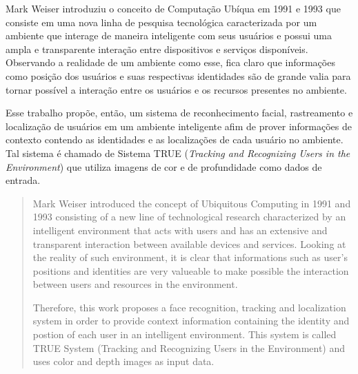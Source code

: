 \begin{resumo}

	Mark Weiser introduziu o conceito de Computação Ubíqua em 1991 e 1993 que consiste em uma nova linha de pesquisa tecnológica caracterizada por um ambiente que interage de maneira inteligente com seus usuários e possui uma ampla e transparente interação entre dispositivos e serviços disponíveis. Observando a realidade de um ambiente como esse, fica claro que informações como posição dos usuários e suas respectivas identidades são de grande valia para tornar possível a interação entre os usuários e os recursos presentes no ambiente.

	Esse trabalho propõe, então, um sistema de reconhecimento facial, rastreamento e localização de usuários em um ambiente inteligente afim de prover informações de contexto contendo as identidades e as localizações de cada usuário no ambiente. Tal sistema é chamado de Sistema TRUE (\textit{Tracking and Recognizing Users in the Environment}) que utiliza imagens de cor e de profundidade como dados de entrada.

\end{resumo}


\begin{abstract}
	
	Mark Weiser introduced the concept of Ubiquitous Computing in 1991 and 1993 consisting of a new line of technological research characterized by an intelligent environment that acts with users and has an extensive and transparent interaction between available devices and services. Looking at the reality of such environment, it is clear that informations such as user's positions and identities are very valueable to make possible the interaction between users and resources in the environment.

	Therefore, this work proposes a face recognition, tracking and localization system in order to provide context information containing the identity and postion of each user in an intelligent environment. This system is called TRUE System (Tracking and Recognizing Users in the Environment) and uses color and depth images as input data.

\end{abstract}

